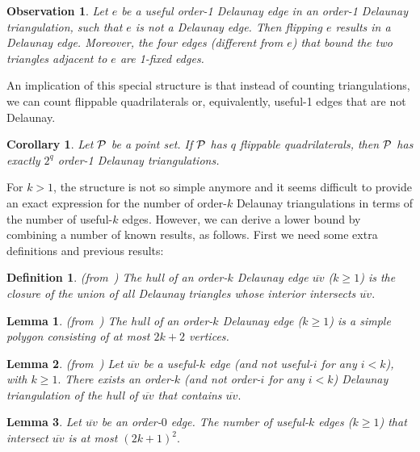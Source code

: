 \documentclass {journal}
\newtheorem {lemma} {Lemma}
\newtheorem {observation} {Observation}
\newtheorem {corollary} {Corollary}
\newtheorem {definition} {Definition}
\newcommand{\Pts}{\cal P}
\begin{document}
\begin{observation}
\label{obs:Order1Edge}
Let $e$ be a useful order-1 Delaunay edge in an order-1 Delaunay triangulation, such that $e$ is not a Delaunay edge.
Then flipping $e$ results in a Delaunay edge. Moreover, the four edges (different from $e$) that bound the two triangles adjacent to $e$ are 1-fixed edges.
\end{observation}

An implication of this special structure is that instead of
counting triangulations, we can count flippable quadrilaterals or,
equivalently, useful-1 edges that are not Delaunay.

\begin{corollary}
\label{cor:flippable}
Let $\Pts$ be a point set. If $\Pts$ has $q$ flippable quadrilaterals, then $\Pts$ has exactly $2^q$ order-1 Delaunay triangulations.
\end{corollary}

For $k > 1$, the structure is not so simple anymore and it seems
difficult to provide an exact expression for the number of
order-$k$ Delaunay triangulations in terms of the number of
useful-$k$ edges. However, we can derive a lower bound by combining a number of known results, as follows.
First we need some extra
definitions and previous results:

\begin{definition}
(from~\cite{ghk-hodt-02}) The \emph{hull} of an order-$k$ Delaunay
edge $\overline{uv}$ ($k\geq 1$) is the closure of the union of
all Delaunay triangles whose interior intersects $\overline{uv}.$
\end{definition}

\begin{lemma} \label{lem:sizehull}
(from~\cite{ghk-hodt-02}) The hull of an order-$k$ Delaunay edge
($k\geq 1$) is a simple polygon consisting of at most $2k+2$
vertices.
\end{lemma}

\begin{lemma} \label{lem:trianghull}
(from~\cite{ghk-hodt-02}) Let $\overline{uv}$ be a useful-$k$ edge
(and not useful-$i$ for any $i<k$), with $k\geq 1.$ There exists
an order-$k$ (and not order-$i$ for any $i < k$) Delaunay
triangulation of the hull of $\overline{uv}$ that contains
$\overline{uv}.$
\end{lemma}

\begin{lemma} \label{lem:UsefkIntersOrder0}
Let $\overline{uv}$ be an order-$0$ edge. The number of useful-$k$
edges ($k\geq 1$) that intersect $\overline{uv}$ is at most
$(2k+1)^2.$
\end{lemma}
\end{document}
